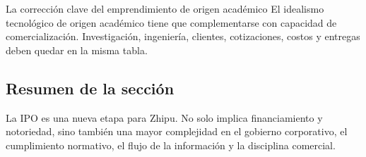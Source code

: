 \begin{importantbox}{La corrección clave del emprendimiento de origen académico}
El idealismo tecnológico de origen académico tiene que complementarse con capacidad de comercialización. Investigación, ingeniería, clientes, cotizaciones, costos y entregas deben quedar en la misma tabla.
\end{importantbox}

\subsection{Resumen de la sección}

La IPO es una nueva etapa para Zhipu. No solo implica financiamiento y notoriedad, sino también una mayor complejidad en el gobierno corporativo, el cumplimiento normativo, el flujo de la información y la disciplina comercial.
